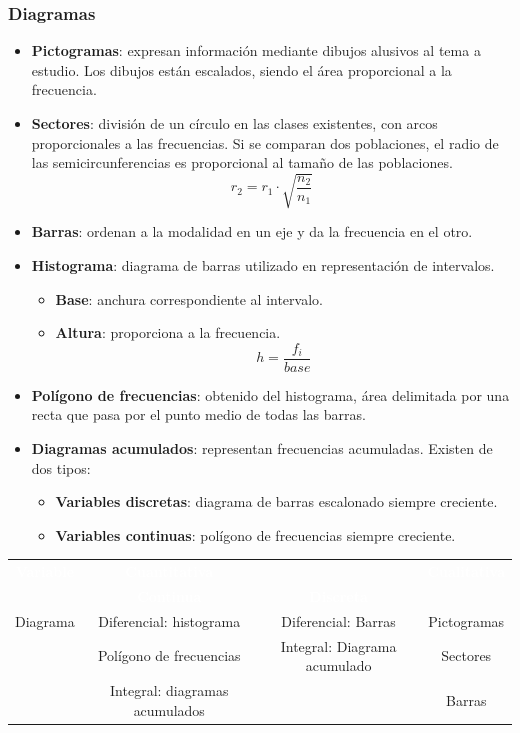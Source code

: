 \subsubsection{Diagramas}
\begin{itemize}[itemsep=0pt,parsep=0pt,topsep=0pt,partopsep=0pt]
    \item \textbf{Pictogramas}: expresan información mediante dibujos alusivos al tema a estudio. Los dibujos están escalados, siendo el área proporcional a la frecuencia.
    \item\textbf{Sectores}: división de un círculo en las clases existentes, con arcos proporcionales a las frecuencias. Si se comparan dos poblaciones, el radio de las semicircunferencias es proporcional al tamaño de las poblaciones.
        \[ r_2 = r_1\cdot\sqrt{\dfrac{n_2}{n_1}} \]
    \item\textbf{Barras}: ordenan a la modalidad en un eje y da la frecuencia en el otro.
    \item\textbf{Histograma}: diagrama de barras utilizado en representación de intervalos.
    \begin{itemize}[itemsep=0pt,parsep=0pt,topsep=0pt,partopsep=0pt]
        \item \textbf{Base}: anchura correspondiente al intervalo.
        \item\textbf{Altura}: proporciona a la frecuencia.
            \[h = \dfrac{f_i}{base}\]
    \end{itemize}
    \item\textbf{Polígono de frecuencias}: obtenido del histograma, área delimitada por una recta que pasa por el punto medio de todas las barras.
    \item\textbf{Diagramas acumulados}: representan frecuencias acumuladas. Existen de dos tipos:
    \begin{itemize}[itemsep=0pt,parsep=0pt,topsep=0pt,partopsep=0pt]
        \item \textbf{Variables discretas}: diagrama de barras escalonado siempre creciente.
        \item\textbf{Variables continuas}: polígono de frecuencias siempre creciente.
    \end{itemize}
\end{itemize}
\begin{table}[H]
    \begin{tabular}{cccc}
        \rowcolor{black}\textcolor{White}{\textbf{Variable}}&\textcolor{White}{\textbf{Cuantitativa}}&&\textcolor{White}{\textbf{Cualitativa}}\\
        \rowcolor{black}&\textcolor{White}{\textbf{Continua}}&\textcolor{White}{\textbf{Discreta}}&\\
        Diagrama&Diferencial: histograma&Diferencial: Barras&Pictogramas\\
        &Polígono de frecuencias&Integral: Diagrama acumulado&Sectores\\
        &Integral: diagramas acumulados&&Barras\\
        \hline
    \end{tabular}
\end{table}
